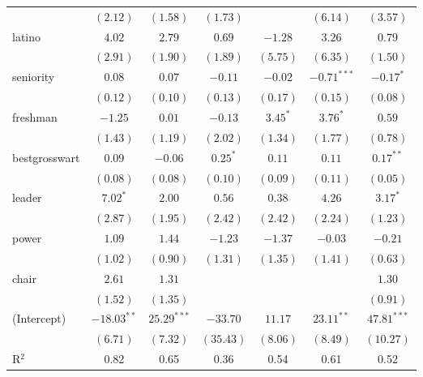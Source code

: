 \documentclass[12pt]{article}
\begin{document}
\begin{table}
\begin{center}
\begin{tabular}{l c c c c c c }
			& $(2.12)$      & $(1.58)$      & $(1.73)$     &              & $(6.14)$      & $(3.57)$      \\
			latino                 & $4.02$        & $2.79$        & $0.69$       & $-1.28$      & $3.26$        & $0.79$        \\
			& $(2.91)$      & $(1.90)$      & $(1.89)$     & $(5.75)$     & $(6.35)$      & $(1.50)$      \\
			seniority              & $0.08$        & $0.07$        & $-0.11$      & $-0.02$      & $-0.71^{***}$ & $-0.17^{*}$   \\
			& $(0.12)$      & $(0.10)$      & $(0.13)$     & $(0.17)$     & $(0.15)$      & $(0.08)$      \\
			freshman               & $-1.25$       & $0.01$        & $-0.13$      & $3.45^{*}$   & $3.76^{*}$    & $0.59$        \\
			& $(1.43)$      & $(1.19)$      & $(2.02)$     & $(1.34)$     & $(1.77)$      & $(0.78)$      \\
			bestgrosswart          & $0.09$        & $-0.06$       & $0.25^{*}$   & $0.11$       & $0.11$        & $0.17^{**}$   \\
			& $(0.08)$      & $(0.08)$      & $(0.10)$     & $(0.09)$     & $(0.11)$      & $(0.05)$      \\
			leader                 & $7.02^{*}$    & $2.00$        & $0.56$       & $0.38$       & $4.26$        & $3.17^{*}$    \\
			& $(2.87)$      & $(1.95)$      & $(2.42)$     & $(2.42)$     & $(2.24)$      & $(1.23)$      \\
			power                  & $1.09$        & $1.44$        & $-1.23$      & $-1.37$      & $-0.03$       & $-0.21$       \\
			& $(1.02)$      & $(0.90)$      & $(1.31)$     & $(1.35)$     & $(1.41)$      & $(0.63)$      \\
			chair                  & $2.61$        & $1.31$        &              &              &               & $1.30$        \\
			& $(1.52)$      & $(1.35)$      &              &              &               & $(0.91)$      \\
			(Intercept)            & $-18.03^{**}$ & $25.29^{***}$ & $-33.70$     & $11.17$      & $23.11^{**}$  & $47.81^{***}$ \\
			& $(6.71)$      & $(7.32)$      & $(35.43)$    & $(8.06)$     & $(8.49)$      & $(10.27)$     \\
			\hline
			R$^2$                  & 0.82          & 0.65          & 0.36         & 0.54         & 0.61          & 0.52          \\

\end{tabular}
\end{center}
\end{table}
\end{document}
